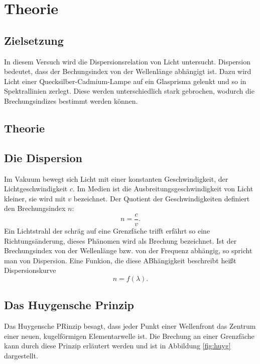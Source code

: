 \section{Theorie}
\label{sec:Theorie}

\subsection{Zielsetzung}
In diesem Versuch wird die Dispersionsrelation von Licht untersucht.
Dispersion bedeutet, dass der Bechungsindex von der Wellenlänge
abhängigt ist.
Dazu wird Licht einer Quecksilber-Cadmium-Lampe auf ein Glasprisma
gelenkt und so in Spektrallinien zerlegt. Diese werden unterschiedlich
stark gebrochen, wodurch die Brechungsindizes bestimmt werden können.

\subsection{Theorie}
\subsection{Die Dispersion}

Im Vakuum bewegt sich Licht mit einer konstanten Geschwindigkeit, der
Lichtgeschwindigkeit $c$. Im Medien ist die Ausbreitungsgeschwindigkeit
von Licht kleiner, sie wird mit $v$ bezeichnet.
Der Quotient der Geschwindigkeiten definiert den
Brechungsindex $n$:
\begin{equation}
  n=\frac{c}{v}.
  \label{eqn:n}
\end{equation}
Ein Lichtstrahl der schräg auf eine Grenzfäche trifft erfährt so eine
Richtungsänderung, dieses Phänomen wird als Brechung bezeichnet.
Ist der Brechungsindex von der Wellenlänge bzw. von der Frequenz
abhängig, so spricht man von Dispersion. Eine Funkion, die diese
ABhängigkeit beschreibt heißt Dispersionskurve
\begin{equation}
  n=f(\lambda).
\end{equation}

\subsection{Das Huygensche Prinzip}
Das Huygensche PRinzip besagt, dass jeder Punkt einer Wellenfront das
Zentrum einer neuen, kugelförmigen Elementarwelle ist.
Die Brechung an einer Grenzfäche kann durch diese Prinzip erläutert werden und
ist in Abbildung \ref{fig:huyg} dargestellt.

